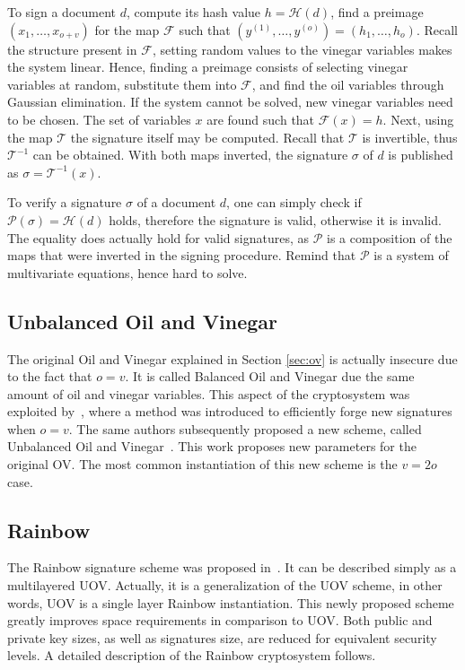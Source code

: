\documentclass{ufsctex/ufsctex}
\begin{document}
To sign a document $d$, compute its hash value $h = \mathcal{H}(d)$, find a
preimage $(x_1,\dots,x_{o+v})$ for the map $\mathcal{F}$ such that
$(y^{(1)},\dots,y^{(o)}) = (h_1,\dots,h_o)$. Recall the structure present in
$\mathcal{F}$, setting random values to the vinegar variables makes the system
linear. Hence, finding a preimage consists of selecting vinegar variables at
random, substitute them into $\mathcal{F}$, and find the oil variables through
Gaussian elimination. If the system cannot be solved, new vinegar variables
need to be chosen. The set of variables $x$ are found such that
$\mathcal{F}(x)=h$. Next, using the map $\mathcal{T}$ the signature itself may
be computed. Recall that $\mathcal{T}$ is invertible, thus $\mathcal{T}^{-1}$
can be obtained. With both maps inverted, the signature $\sigma$ of $d$ is
published as $\sigma = \mathcal{T}^{-1}(x)$.

To verify a signature $\sigma$ of a document $d$, one can simply check if
$\mathcal{P}(\sigma) = \mathcal{H}(d)$ holds, therefore the signature is valid,
otherwise it is invalid. The equality does actually hold for valid signatures,
as $\mathcal{P}$ is a composition of the maps that were inverted in the signing
procedure. Remind that $\mathcal{P}$ is a system of multivariate equations,
hence hard to solve.

\subsection{Unbalanced Oil and Vinegar}

The original Oil and Vinegar explained in Section \ref{sec:ov} is actually
insecure due to the fact that $o = v$. It is called Balanced Oil and Vinegar
due the same amount of oil and vinegar variables. This aspect of the
cryptosystem was exploited by~\cite{kipnis1998cryptanalysis}, where a method
was introduced to efficiently forge new signatures when $o = v$. The same
authors subsequently proposed a new scheme, called Unbalanced Oil and
Vinegar~\cite{kipnis1999unbalanced}. This work proposes new parameters for the
original OV. The most common instantiation of this new scheme is the $v = 2o$
case.

\subsection{Rainbow}\label{sec:rainbow}

The Rainbow signature scheme was proposed in~\cite{ding2005rainbow}. It can be
described simply as a multilayered UOV. Actually, it is a generalization of the
UOV scheme, in other words, UOV is a single layer Rainbow instantiation. This
newly proposed scheme greatly improves space requirements in comparison to UOV.
Both public and private key sizes, as well as signatures size, are reduced for
equivalent security levels. A detailed description of the Rainbow cryptosystem
follows.
\end{document}
